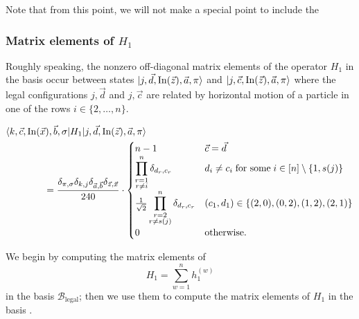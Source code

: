 \documentclass[../thesis-main/thesis-main]{subfiles}
\begin{document}
Note that from this point, we will not make a special point to include the 

\subsubsection{Matrix elements of $H_1$}

Roughly speaking, the nonzero off-diagonal matrix elements of the operator $H_{1}$ in the basis  occur between states $|j,\vec{d},\operatorname{In}(\vec{z}),\vec{a},\pi\rangle$ and $|j,\vec{c},\operatorname{In}(\vec{z}),\vec{a},\pi\rangle$ where the legal configurations $j,\vec{d}$ and $j,\vec{c}$ are related by horizontal motion of a particle in one of the rows $i\in\{2,\ldots,n\}$. 
\begin{mdframed}[frametitle=Matrix elements of $H_{1}$]
\begin{align}
&\langle k,\vec{c},\operatorname{In}(\vec{x}),\vec{b},\sigma|H_{1}|j,\vec{d},\operatorname{In}(\vec{z}),\vec{a},\pi\rangle\nonumber\\
&\qquad\qquad=\frac{\delta_{\pi,\sigma}\delta_{k,j}\delta_{\vec{a},\vec{b}}\delta_{\vec{z},\vec{x}}}{240}\cdot\begin{cases}
n-1 & \vec{c}=\vec{d}\\
\displaystyle\prod_{\substack{r=1\\r\neq i}}^n
\delta_{d_{r},c_{r}} & d_{i}\neq c_{i}\;\text{for some}\; i\in[n]\setminus\{1,s(j)\}\\
\frac{1}{\sqrt{2}} \displaystyle\prod_{\substack{r=2\\r\neq s(j)}}^n \delta_{d_{r},c_{r}} & (c_{1},d_{1})\in\{(2,0),(0,2),(1,2),(2,1)\}\\
0 & \text{otherwise.}
\end{cases}\label{eq:H1_goodbasis-1}
\end{align}
\end{mdframed}

\newcommand{\configtrans}[2]{
\configex{#1}
$~\longrightarrow~$
\configex{#2}
}
We begin by computing the matrix elements of 
\begin{equation}
H_{1}=\sum_{w=1}^{n}h_{1}^{(w)}
\end{equation}
in the basis $\mathcal{B}_{{\text{legal}}}$; then we use them to compute the matrix elements of $H_1$ in the basis .
\end{document}
